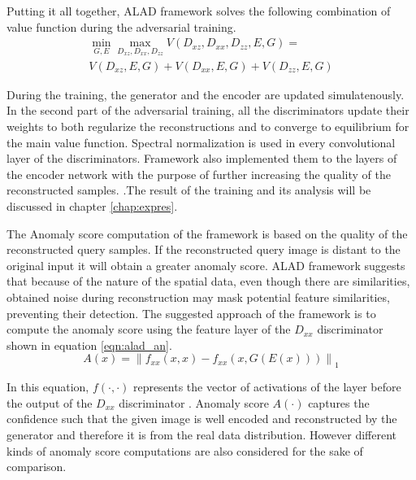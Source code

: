 Putting it all together, ALAD framework solves the following combination of value function during the adversarial
training. 
\begin{equation}
\begin{array}{l}{\min _{G, E} \max _{D_{x z}, D_{x x}, D_{z z}} V\left(D_{x z}, D_{x x}, D_{z z}, E, G\right)=} \\ {V\left(D_{x z}, E, G\right)+V\left(D_{x x}, E, G\right)+V\left(D_{z z}, E, G\right)}\end{array} 
\end{equation}

During the training, the generator and the encoder are updated simulatenously. In the
second part of the adversarial training, all the discriminators update their weights to both
regularize the reconstructions and to converge to equilibrium for the main value function. Spectral
normalization is used in every convolutional layer of the discriminators. Framework also implemented
them to the layers of the encoder network with the purpose of  further increasing the quality of the reconstructed
samples. \cite{DBLP:journals/corr/abs-1812-02288}.The
result of the training and its analysis will be discussed in chapter \ref{chap:expres}.

The Anomaly score computation of the framework is based on the quality of the reconstructed query
samples. If the reconstructed query image is distant to the original input it will obtain a greater
anomaly score. ALAD framework suggests that because of the nature of the spatial data, even though
there are similarities, obtained noise during reconstruction may mask potential feature
similarities, preventing their detection. The suggested approach of the framework is to compute the
anomaly score using the feature layer of the $D_{xx}$ discriminator shown in equation
\ref{eqn:alad_an}.
\begin{equation}
  \label{eqn:alad_an}
  A(x)=\left\|f_{x x}(x, x)-f_{x x}(x, G(E(x)))\right\|_{1} 
\end{equation}

In this equation, $f(\cdot, \cdot)$ represents the vector of activations of the layer before the
output of the $D_{xx}$ discriminator \cite{DBLP:journals/corr/abs-1812-02288}. Anomaly score
$A(\cdot)$ captures the confidence such that the given image is well encoded and reconstructed by
the generator and therefore it is from the real data distribution.
\cite{DBLP:journals/corr/abs-1812-02288} However different kinds of anomaly score computations are
also considered for the sake of comparison. 

